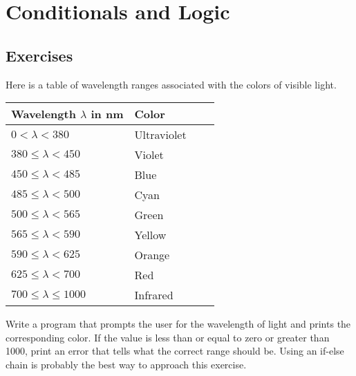 \chapter{Conditionals and Logic}

\section{Exercises}

\begin{exercise}
Here is a table of wavelength ranges associated with the colors of visible light.

\renewcommand{\arraystretch}{1.5}  %
\begin{tabular}{|l|l|l|r|}
\hline
{\bf Wavelength $\lambda$  in nm} & {\bf Color}\\ \hline
$0 < \lambda < 380$ & Ultraviolet \\ \hline
$380 \leq \lambda < 450$ & Violet \\ \hline
$450 \leq \lambda < 485$ & Blue \\ \hline
$485 \leq \lambda < 500$ & Cyan \\ \hline
$500 \leq \lambda < 565$ & Green \\ \hline
$565 \leq \lambda < 590$ & Yellow \\ \hline
$590 \leq \lambda < 625$ & Orange \\ \hline
$625 \leq \lambda < 700$ & Red \\ \hline
$700 \leq \lambda \leq 1000$ & Infrared \\ \hline
\end{tabular}

\renewcommand{\arraystretch}{1.0} %

Write a program that prompts the user for the wavelength of light and prints the corresponding color. If the value is less than or equal to zero or greater than 1000, print an error that tells what the correct range should be. Using an if-else chain is probably the best way to approach this exercise.
\end{exercise}

